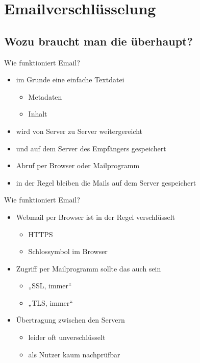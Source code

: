 \section{Emailverschlüsselung}

\subsection{Wozu braucht man die überhaupt?}

\begin{frame}{Wie funktioniert Email?}
  \begin{itemize}
    \item im Grunde eine einfache Textdatei
      \begin{itemize}
	\item Metadaten
	\item Inhalt
      \end{itemize}
    \item wird von Server zu Server weitergereicht
    \item und auf dem Server des Empfängers gespeichert
    \item Abruf per Browser oder Mailprogramm
    \item in der Regel bleiben die Mails auf dem Server gespeichert
  \end{itemize}
\end{frame}

\begin{frame}{Wie funktioniert Email?}
  \begin{itemize}
    \item Webmail per Browser ist in der Regel verschlüsselt
      \begin{itemize}
	\item HTTPS
	\item Schlossymbol im Browser
      \end{itemize}
    \item Zugriff per Mailprogramm sollte das auch sein
      \begin{itemize}
	\item „SSL, immer“
	\item „TLS, immer“
      \end{itemize}
    \item Übertragung zwischen den Servern
      \begin{itemize}
	\item leider oft unverschlüsselt
	\item als Nutzer kaum nachprüfbar
      \end{itemize}
  \end{itemize}

\end{frame}


